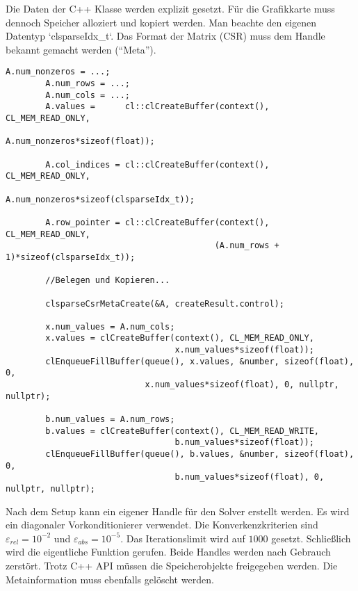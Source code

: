 		Die Daten der C++ Klasse werden explizit gesetzt. Für die Grafikkarte muss dennoch Speicher alloziert und kopiert werden. Man beachte den eigenen Datentyp \li`clsparseIdx_t`. Das Format der Matrix (CSR) muss dem \Gls{Handle} bekannt gemacht werden (\enquote{Meta}).\\
    	    \begin{lstlisting}[caption=clSPARSE: Vektoren und Matrizen setzen]
		A.num_nonzeros = ...;
		A.num_rows = ...;
		A.num_cols = ...;    
		A.values =      cl::clCreateBuffer(context(), CL_MEM_READ_ONLY, 
		                                   A.num_nonzeros*sizeof(float));

		A.col_indices = cl::clCreateBuffer(context(), CL_MEM_READ_ONLY, 
		                                   A.num_nonzeros*sizeof(clsparseIdx_t));

		A.row_pointer = cl::clCreateBuffer(context(), CL_MEM_READ_ONLY, 
		                                  (A.num_rows + 1)*sizeof(clsparseIdx_t)); 
		
		//Belegen und Kopieren...
                                     
		clsparseCsrMetaCreate(&A, createResult.control);
      
		x.num_values = A.num_cols;
		x.values = clCreateBuffer(context(), CL_MEM_READ_ONLY, 
		                          x.num_values*sizeof(float));
		clEnqueueFillBuffer(queue(), x.values, &number, sizeof(float), 0, 
		                    x.num_values*sizeof(float), 0, nullptr, nullptr);
                                    
		b.num_values = A.num_rows;
		b.values = clCreateBuffer(context(), CL_MEM_READ_WRITE, 
		                          b.num_values*sizeof(float));
		clEnqueueFillBuffer(queue(), b.values, &number, sizeof(float), 0, 
		                          b.num_values*sizeof(float), 0, nullptr, nullptr);
		\end{lstlisting}  
		
		Nach dem Setup kann ein eigener \Gls{Handle} für den Solver erstellt werden. Es wird ein diagonaler Vorkonditionierer verwendet. Die Konverkenzkriterien sind $\varepsilon_{rel} = 10^{-2}$ und $\varepsilon_{abs} = 10^{-5}$. Das Iterationslimit wird auf $1000$ gesetzt. Schließlich wird die eigentliche Funktion gerufen. Beide \Glspl{Handle} werden nach Gebrauch zerstört. Trotz C++ \Gls{API} müssen die Speicherobjekte freigegeben werden. Die Metainformation muss ebenfalls gelöscht werden.
		                    
